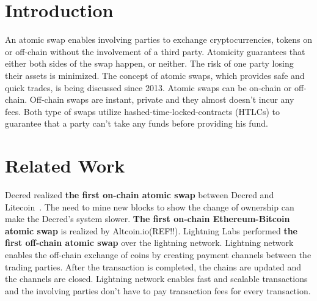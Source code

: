 \section{Introduction}\label{sec:intro}
An atomic swap enables involving parties to exchange cryptocurrencies, tokens on or off-chain without the involvement of a third party. Atomicity guarantees that either both sides of the swap happen, or neither. The risk of one party losing their assets is minimized. The concept of atomic swaps, which provides safe and quick trades, is being discussed since 2013\cite{altcoin}. Atomic swaps can be on-chain or off-chain. Off-chain swaps are instant, private and they almost doesn't incur any fees. Both type of swaps utilize hashed-time-locked-contracts (HTLCs) to guarantee that a party can't take any funds before providing his fund.


\section{Related Work}
Decred realized \textbf{the first on-chain atomic swap} between Decred and Litecoin~\cite{decred}. The need to mine new blocks to show the change of ownership can make the Decred's system slower. \textbf{The first on-chain Ethereum-Bitcoin atomic swap} is realized by Altcoin.io(REF!!). Lightning Labs performed \textbf{the first off-chain atomic swap} over the lightning network. Lightning network enables the off-chain exchange of coins  by creating payment channels between the trading parties. After the transaction is completed, the chains are updated and the channels are closed. Lightning network enables fast and scalable transactions and the involving parties don't have to pay transaction fees for every transaction. 

